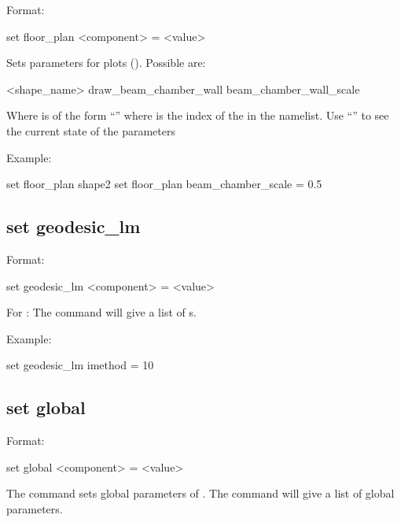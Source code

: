 {{Format:
\begin{example}
  set floor_plan <component> = <value>
\end{example}


Sets parameters for  plots ().  Possible
 are:
\begin{example}
  <shape_name>%
  draw_beam_chamber_wall
  beam_chamber_wall_scale
\end{example}
Where  is of the form ``'' where  is the index
of the  in the  namelist.  Use ``'' to see the current state of the  parameters

Example:
\begin{example}
  set floor_plan shape2%
  set floor_plan beam_chamber_scale = 0.5
\end{example}


\subsection{set geodesic_lm}
\label{s:set.geodesic.lm}

Format:
\begin{example}
  set geodesic_lm <component> = <value>
\end{example}

For : The  command will give a list of
s.

Example:
\begin{example}
  set geodesic_lm imethod = 10
\end{example}


\subsection{set global}
\label{s:set.global}

Format:
\begin{example}
  set global <component> = <value>
\end{example}

The  command sets global parameters of \tao.
The  command will give a list of global parameters.

}}
